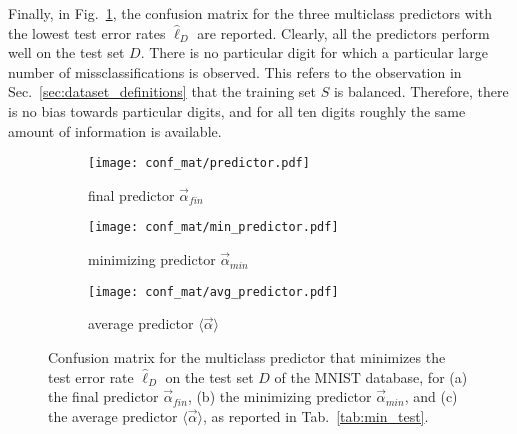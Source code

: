 Finally, in Fig.~\ref{fig:conf_mat}, the confusion matrix for the three multiclass predictors with the lowest test error rates $\hat{\ell}_D$ are reported. Clearly, all the predictors perform well on the test set $D$. There is no particular digit for which a particular large number of missclassifications is observed. This refers to the observation in Sec.~\ref{sec:dataset_definitions} that the training set $S$ is balanced. Therefore, there is no bias towards particular digits, and for all ten digits roughly the same amount of information is available. 

\begin{figure}
\centering
	\begin{subfigure}[t]{0.49\textwidth}
	\centering
		\texttt{[image: conf\_mat/predictor.pdf]} 
		\caption{final predictor $\vec{\alpha}_{fin}$}
	\end{subfigure}
	\hfill
	\begin{subfigure}[t]{0.49\textwidth}
	\centering
		\texttt{[image: conf\_mat/min\_predictor.pdf]} 
		\caption{minimizing predictor $\vec{\alpha}_{min}$}
	\end{subfigure}
		\begin{subfigure}[t]{0.49\textwidth}
	\centering
		\texttt{[image: conf\_mat/avg\_predictor.pdf]} 
		\caption{average predictor $\langle\vec{\alpha}\rangle$}
	\end{subfigure}
	\caption{Confusion matrix for the multiclass predictor that minimizes the test error rate $\hat{\ell}_D$ on the test set $D$ of the MNIST database, for (a) the final predictor $\vec{\alpha}_{fin}$, (b) the minimizing predictor $\vec{\alpha}_{min}$, and (c) the average predictor $\langle\vec{\alpha}\rangle$, as reported in Tab.~\ref{tab:min_test}.}\label{fig:conf_mat}
\end{figure}